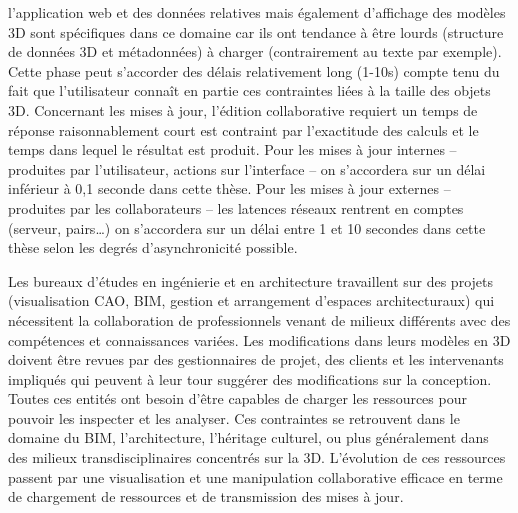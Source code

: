 l'application web et des données relatives mais également d'affichage des 
modèles 3D sont spécifiques dans ce domaine car ils ont 
tendance à être lourds (structure de données 3D et métadonnées) à charger 
(contrairement au texte par exemple). Cette phase peut s'accorder des délais 
relativement long (1-10s) compte tenu du fait que l'utilisateur connaît en partie ces 
contraintes liées à la taille des objets 3D. Concernant les mises à jour, l'édition 
collaborative requiert un temps de réponse raisonnablement court est contraint par 
l'exactitude des calculs et le temps dans lequel le résultat est produit. Pour les 
mises à jour internes -- produites par l'utilisateur, actions sur l'interface -- on 
s'accordera sur un délai inférieur à 0,1 seconde dans cette thèse. 
Pour les mises à jour externes -- produites par les collaborateurs -- les latences 
réseaux rentrent en comptes (serveur, pairs\ldots) on s'accordera sur un délai 
entre 1 et 10 secondes dans cette thèse selon les degrés d'asynchronicité 
possible. 

Les bureaux d'études en ingénierie et en architecture travaillent sur des projets 
(visualisation \gls{CAO}, \gls{BIM}, gestion et arrangement d'espaces 
architecturaux) qui 
nécessitent la collaboration de professionnels venant de milieux différents avec 
des compétences et connaissances variées. Les modifications dans leurs 
modèles en \gls{3D} doivent être revues par des gestionnaires de projet, des 
clients et les intervenants impliqués qui peuvent à leur tour suggérer des 
modifications sur la conception. Toutes ces entités ont besoin d'être capables de 
charger les ressources pour pouvoir les inspecter et les analyser. Ces contraintes 
se retrouvent dans le domaine du \gls{BIM}, l'architecture, l'héritage culturel, ou 
plus généralement dans des milieux transdisciplinaires concentrés sur la \gls{3D}. 
L'évolution de ces ressources passent par une visualisation et une manipulation 
collaborative efficace en terme de chargement de ressources et de transmission 
des mises à jour.